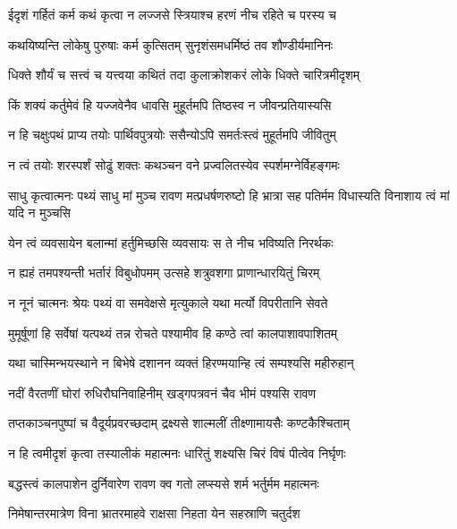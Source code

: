 \twolineshloka
{ईदृशं गर्हितं कर्म कथं कृत्वा न लज्जसे}
{स्त्रियाश्च हरणं नीच रहिते च परस्य च} %

\twolineshloka
{कथयिष्यन्ति लोकेषु पुरुषाः कर्म कुत्सितम्}
{सुनृशंसमधर्मिष्ठं तव शौण्डीर्यमानिनः} %

\twolineshloka
{धिक्ते शौर्यं च सत्त्वं च यत्त्वया कथितं तदा}
{कुलाक्रोशकरं लोके धिक्ते चारित्रमीदृशम्} %

\twolineshloka
{किं शक्यं कर्तुमेवं हि यज्जवेनैव धावसि}
{मुहूर्तमपि तिष्ठस्व न जीवन्प्रतियास्यसि} %

\twolineshloka
{न हि चक्षुःपथं प्राप्य तयोः पार्थिवपुत्रयोः}
{ससैन्योऽपि समर्तःस्त्वं मुहूर्तमपि जीवितुम्} %

\twolineshloka
{न त्वं तयोः शरस्पर्शं सोढुं शक्तः कथञ्चन}
{वने प्रज्वलितस्येव स्पर्शमग्नेर्विहङ्गमः} %

\threelineshloka
{साधु कृत्वात्मनः पथ्यं साधु मां मुञ्च रावण}
{मत्प्रधर्षणरुष्टो हि भ्रात्रा सह पतिर्मम}
{विधास्यति विनाशाय त्वं मां यदि न मुञ्चसि} %

\twolineshloka
{येन त्वं व्यवसायेन बलान्मां हर्तुमिच्छसि}
{व्यवसायः स ते नीच भविष्यति निरर्थकः} %

\twolineshloka
{न ह्यहं तमपश्यन्ती भर्तारं विबुधोपमम्}
{उत्सहे शत्रुवशगा प्राणान्धारयितुं चिरम्} %

\twolineshloka
{न नूनं चात्मनः श्रेयः पथ्यं वा समवेक्षसे}
{मृत्युकाले यथा मर्त्यो विपरीतानि सेवते} %

\twolineshloka
{मुमूर्षूणां हि सर्वेषां यत्पथ्यं तन्न रोचते}
{पश्यामीव हि कण्ठे त्वां कालपाशावपाशितम्} %

\twolineshloka
{यथा चास्मिन्भयस्थाने न बिभेषे दशानन}
{व्यक्तं हिरण्मयान्हि त्वं सम्पश्यसि महीरुहान्} %

\twolineshloka
{नदीं वैरतणीं घोरां रुधिरौघनिवाहिनीम्}
{खड्गपत्रवनं चैव भीमं पश्यसि रावण} %

\twolineshloka
{तप्तकाञ्चनपुष्पां च वैदूर्यप्रवरच्छदाम्}
{द्रक्ष्यसे शाल्मलीं तीक्ष्णामायसैः कण्टकैश्चिताम्} %

\twolineshloka
{न हि त्वमीदृशं कृत्वा तस्यालीकं महात्मनः}
{धारितुं शक्ष्यसि चिरं विषं पीत्वेव निर्घृणः} %

\twolineshloka
{बद्धस्त्वं कालपाशेन दुर्निवारेण रावण}
{क्व गतो लप्स्यसे शर्म भर्तुर्मम महात्मनः} %

\twolineshloka
{निमेषान्तरमात्रेण विना भ्रातरमाहवे}
{राक्षसा निहता येन सहस्राणि चतुर्दश} %

